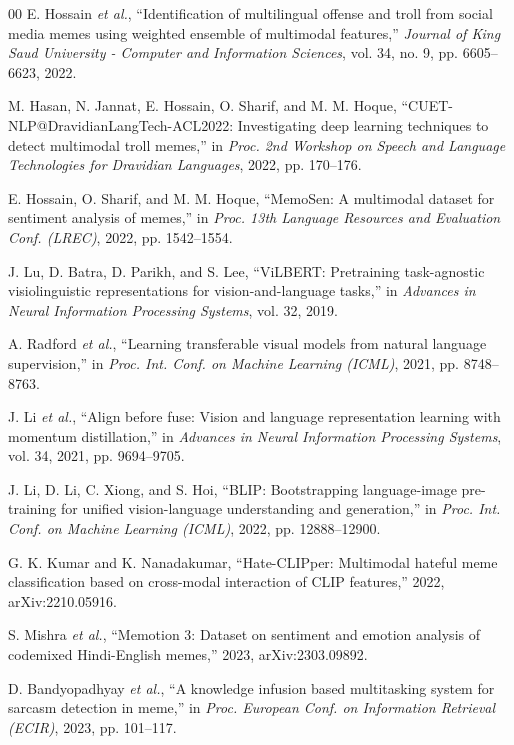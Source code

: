 \documentclass[conference]{IEEEtran}
\begin{document}
\begin{thebibliography}{00}
 E. Hossain \textit{et al.}, ``Identification of multilingual offense and troll from social media memes using weighted ensemble of multimodal features,'' \textit{Journal of King Saud University - Computer and Information Sciences}, vol. 34, no. 9, pp. 6605--6623, 2022.

 M. Hasan, N. Jannat, E. Hossain, O. Sharif, and M. M. Hoque, ``CUET-NLP@DravidianLangTech-ACL2022: Investigating deep learning techniques to detect multimodal troll memes,'' in \textit{Proc. 2nd Workshop on Speech and Language Technologies for Dravidian Languages}, 2022, pp. 170--176.

 E. Hossain, O. Sharif, and M. M. Hoque, ``MemoSen: A multimodal dataset for sentiment analysis of memes,'' in \textit{Proc. 13th Language Resources and Evaluation Conf. (LREC)}, 2022, pp. 1542--1554.

 J. Lu, D. Batra, D. Parikh, and S. Lee, ``ViLBERT: Pretraining task-agnostic visiolinguistic representations for vision-and-language tasks,'' in \textit{Advances in Neural Information Processing Systems}, vol. 32, 2019.

 A. Radford \textit{et al.}, ``Learning transferable visual models from natural language supervision,'' in \textit{Proc. Int. Conf. on Machine Learning (ICML)}, 2021, pp. 8748--8763.

 J. Li \textit{et al.}, ``Align before fuse: Vision and language representation learning with momentum distillation,'' in \textit{Advances in Neural Information Processing Systems}, vol. 34, 2021, pp. 9694--9705.

 J. Li, D. Li, C. Xiong, and S. Hoi, ``BLIP: Bootstrapping language-image pre-training for unified vision-language understanding and generation,'' in \textit{Proc. Int. Conf. on Machine Learning (ICML)}, 2022, pp. 12888--12900.

 G. K. Kumar and K. Nanadakumar, ``Hate-CLIPper: Multimodal hateful meme classification based on cross-modal interaction of CLIP features,'' 2022, arXiv:2210.05916.

 S. Mishra \textit{et al.}, ``Memotion 3: Dataset on sentiment and emotion analysis of codemixed Hindi-English memes,'' 2023, arXiv:2303.09892.

 D. Bandyopadhyay \textit{et al.}, ``A knowledge infusion based multitasking system for sarcasm detection in meme,'' in \textit{Proc. European Conf. on Information Retrieval (ECIR)}, 2023, pp. 101--117.


\end{thebibliography}
\end{document}
